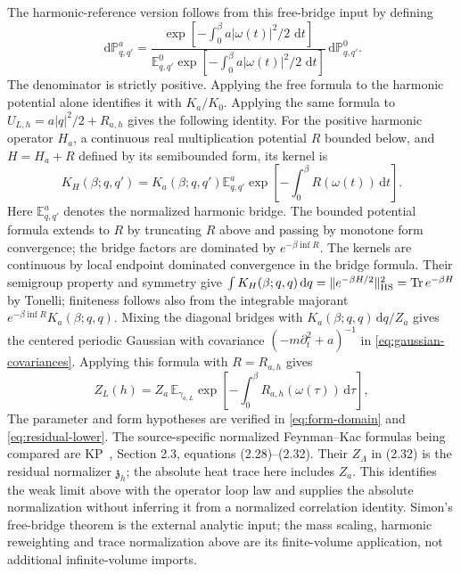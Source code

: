 \documentclass[11pt]{article}
\numberwithin{equation}{section}
\theoremstyle{definition}
\newcommand{\E}{\mathbb E}
\newcommand{\dd}{\,\mathrm d}
\newcommand{\Tr}{\operatorname{Tr}}
\begin{document}
The harmonic-reference version follows from this free-bridge input by defining
\begin{equation}
 \dd\mathbb P^a_{q,q'}=
 \frac{\exp[-\int_0^\beta a|\omega(t)|^2/2\,\dd t]}
 {\E^0_{q,q'}\exp[-\int_0^\beta a|\omega(t)|^2/2\,\dd t]}
 \dd\mathbb P^0_{q,q'}.
 \label{eq:fk-harmonic-bridge-density}
\end{equation}
The denominator is strictly positive. Applying the free formula to the
harmonic potential alone identifies it with $K_a/K_0$. Applying the same
formula to $U_{L,h}=a|q|^2/2+R_{a,h}$ gives the following identity.
For the positive harmonic operator $H_a$, a continuous real multiplication
potential $R$ bounded below, and $H=H_a+R$ defined by its semibounded form,
its kernel is
\[
 K_H(\beta;q,q')=K_a(\beta;q,q')
       \E^a_{q,q'}\exp\left[-\int_0^\beta R(\omega(t))\dd t\right].
\]
Here $\E^a_{q,q'}$ denotes the normalized harmonic bridge. The bounded
potential formula extends to $R$ by truncating $R$ above and passing by
monotone form convergence; the bridge factors are dominated by
$e^{-\beta\inf R}$. The kernels are continuous by local endpoint dominated
convergence in the bridge formula. Their semigroup property and symmetry give
$\int K_H(\beta;q,q)\dd q=\|e^{-\beta H/2}\|_{\rm HS}^2
=\Tr e^{-\beta H}$ by Tonelli; finiteness follows also from the
integrable majorant $e^{-\beta\inf R}K_a(\beta;q,q)$.
Mixing the diagonal bridges with $K_a(\beta;q,q)\dd q/Z_a$ gives
the centered periodic Gaussian with covariance
$(-m\partial_t^2+a)^{-1}$ in \eqref{eq:gaussian-covariances}.
Applying this formula with $R=R_{a,h}$ gives
\begin{equation}
 Z_L(h)=Z_a\,\E_{\gamma_{a,L}}
 \exp\left[-\int_0^\beta R_{a,h}(\omega(\tau))\dd\tau\right],
 \label{eq:fk}
\end{equation}
The parameter and form hypotheses are verified in
\eqref{eq:form-domain} and \eqref{eq:residual-lower}.  The source-specific
normalized Feynman--Kac formulas being compared are KP~\cite{KP},
Section 2.3, equations (2.28)--(2.32). Their $Z_\Lambda$ in (2.32) is
the residual normalizer $\mathfrak z_h$; the absolute heat trace here includes
$Z_a$. This identifies the weak limit above with the operator loop law and
supplies the absolute normalization without inferring it from a normalized
correlation identity. Simon's free-bridge theorem is the external analytic
input; the mass scaling, harmonic reweighting and trace normalization above
are its finite-volume application, not additional infinite-volume imports.
\end{document}
